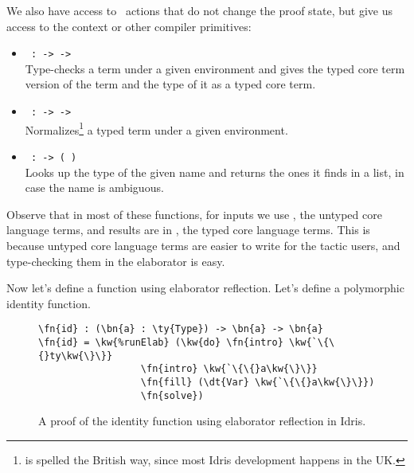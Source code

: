 We also have access to \Elab\ actions that do not change the proof state, but give us access to the context or other compiler primitives:
\begin{itemize}
\item\texttt{ :  \IdrisType{(}\IdrisType{,}  \IdrisType{)} ->  ->  \IdrisType{(}\IdrisType{,} \IdrisType{)}}\\
Type-checks a term under a given environment and gives the typed core term version of the  term and the type of it as a typed core term.
\item\texttt{ :  \IdrisType{(}\IdrisType{,}  \IdrisType{)} ->  ->  }\\
Normalizes\footnote{ is spelled the British way, since most Idris development happens in the UK.} a typed term under a given environment.
\item\texttt{ :  ->  ( \IdrisType{(}\IdrisType{,} \IdrisType{,} \IdrisType{)})}\\
Looks up the type of the given name and returns the ones it finds in a list, in case the name is ambiguous.
\end{itemize}

Observe that in most of these functions, for inputs we use , the
untyped core language terms, and results are in , the typed core
language terms.  This is because untyped core language terms are easier to
write for the tactic users, and type-checking them in the elaborator is easy.

Now let's define a function using elaborator reflection.
Let's define a polymorphic identity function.


\begin{figure}[ht]
  \caption{A proof of the identity function using elaborator reflection in Idris.}
\begin{Verbatim}[framesep=2mm, label=\footnotesize{\normalfont{Idris}}, labelposition=topline]
\fn{id} : (\bn{a} : \ty{Type}) -> \bn{a} -> \bn{a}
\fn{id} = \kw{%runElab} (\kw{do} \fn{intro} \kw{`\{\{}ty\kw{\}\}}
                  \fn{intro} \kw{`\{\{}a\kw{\}\}}
                  \fn{fill} (\dt{Var} \kw{`\{\{}a\kw{\}\}})
                  \fn{solve})
\end{Verbatim}
\end{figure}

